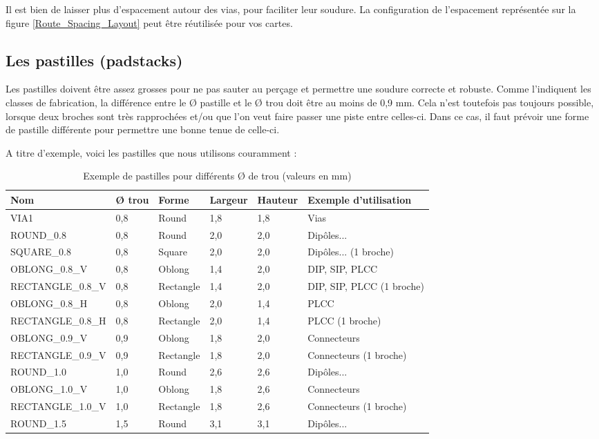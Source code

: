 \documentclass[a4paper]{article}
\begin{document}
Il est bien de laisser plus d'espacement autour des vias, pour faciliter leur soudure. La configuration de l'espacement représentée sur la figure \ref{Route_Spacing_Layout} peut être réutilisée pour vos cartes.

\subsection{Les pastilles (padstacks)}

Les pastilles doivent être assez grosses pour ne pas sauter au perçage et permettre une soudure correcte et robuste. Comme l'indiquent les classes de fabrication, la différence entre le \O{} pastille et le \O{} trou doit être au moins de 0,9 mm. Cela n'est toutefois pas toujours possible, lorsque deux broches sont très rapprochées et/ou que l'on veut faire passer une piste entre celles-ci. Dans ce cas, il faut prévoir une forme de pastille différente pour permettre une bonne tenue de celle-ci.

A titre d'exemple, voici les pastilles que nous utilisons couramment :

\begin{table}[H]
	\centering
	\begin{tabular}{|l||l|l|l|l|l|}\hline
			Nom & \O{} trou & Forme & Largeur & Hauteur & Exemple d'utilisation\\\hline\hline
			VIA1 & 0,8 & Round & 1,8 & 1,8 & Vias\\\hline
			ROUND\_0.8 & 0,8 & Round & 2,0 & 2,0 & Dipôles...\\\hline
			SQUARE\_0.8 & 0,8 & Square & 2,0 & 2,0 & Dipôles... (1\iere{} broche)\\\hline
			OBLONG\_0.8\_V & 0,8 & Oblong & 1,4 & 2,0 & DIP, SIP, PLCC\\\hline
			RECTANGLE\_0.8\_V & 0,8 & Rectangle & 1,4 & 2,0 & DIP, SIP, PLCC (1\iere{} broche)\\\hline
			OBLONG\_0.8\_H & 0,8 & Oblong & 2,0 & 1,4 & PLCC\\\hline
			RECTANGLE\_0.8\_H & 0,8 & Rectangle & 2,0 & 1,4 & PLCC (1\iere{} broche)\\\hline
			OBLONG\_0.9\_V & 0,9 & Oblong & 1,8 & 2,0 & Connecteurs\\\hline
			RECTANGLE\_0.9\_V & 0,9 & Rectangle & 1,8 & 2,0 & Connecteurs (1\iere{} broche)\\\hline
			ROUND\_1.0 & 1,0 & Round & 2,6 & 2,6 & Dipôles...\\\hline
			OBLONG\_1.0\_V & 1,0 & Oblong & 1,8 & 2,6 & Connecteurs\\\hline
			RECTANGLE\_1.0\_V & 1,0 & Rectangle & 1,8 & 2,6 & Connecteurs (1\iere{} broche)\\\hline
			ROUND\_1.5 & 1,5 & Round & 3,1 & 3,1 & Dipôles...\\\hline
	\end{tabular}
	\caption{Exemple de pastilles pour différents \O{} de trou (valeurs en mm)
		\label{Exemple_de_pastilles}}
\end{table}
\end{document}

